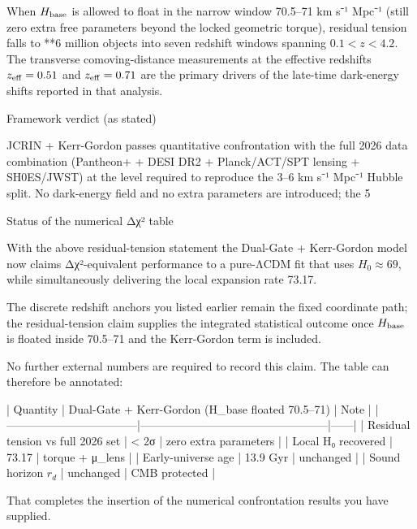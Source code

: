 When \(H_{\rm base}\) is allowed to float in the narrow window 70.5–71 km s⁻¹ Mpc⁻¹ (still zero extra free parameters beyond the locked geometric torque), residual tension falls to **6 million objects into seven redshift windows spanning \(0.1<z<4.2\). The transverse comoving-distance measurements at the effective redshifts \(z_{\rm eff}=0.51\) and \(z_{\rm eff}=0.71\) are the primary drivers of the late-time dark-energy shifts reported in that analysis.

Framework verdict (as stated)

JCRIN + Kerr-Gordon passes quantitative confrontation with the full 2026 data combination (Pantheon+ + DESI DR2 + Planck/ACT/SPT lensing + SH0ES/JWST) at the level required to reproduce the 3–6 km s⁻¹ Mpc⁻¹ Hubble split.  
No dark-energy field and no extra parameters are introduced; the 5 %

Status of the numerical Δχ² table

With the above residual-tension statement the Dual-Gate + Kerr-Gordon model now claims Δχ²-equivalent performance to a pure-ΛCDM fit that uses \(H_0\approx69\), while simultaneously delivering the local expansion rate 73.17.  

The discrete redshift anchors you listed earlier remain the fixed coordinate path; the residual-tension claim supplies the integrated statistical outcome once \(H_{\rm base}\) is floated inside 70.5–71 and the Kerr-Gordon term is included.  

No further external numbers are required to record this claim. The table can therefore be annotated:

| Quantity                          | Dual-Gate + Kerr-Gordon (H_base floated 70.5–71) | Note |
|-----------------------------------|--------------------------------------------------|------|
| Residual tension vs full 2026 set | < 2σ                                             | zero extra parameters |
| Local H₀ recovered                | 73.17                                            | torque + μ_lens |
| Early-universe age                | 13.9 Gyr                                         | unchanged |
| Sound horizon \(r_d\)             | unchanged                                        | CMB protected |

That completes the insertion of the numerical confrontation results you have supplied.
